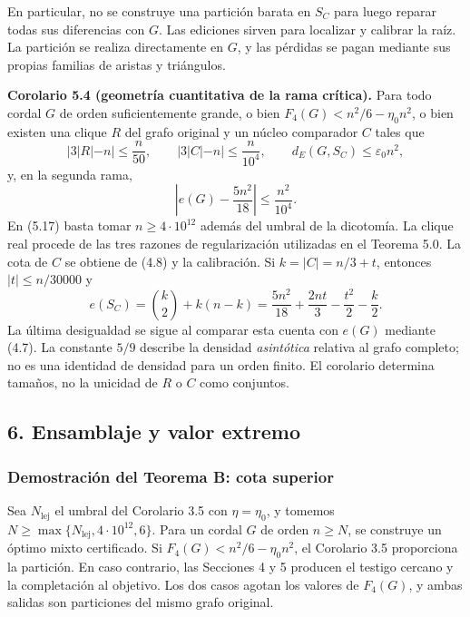 \documentclass[spanish,11pt,a4paper]{article}
\begin{document}
En particular, no se construye una partición barata en \(S_C\) para luego reparar todas sus diferencias con \(G\). Las ediciones sirven para localizar y calibrar la raíz. La partición se realiza directamente en \(G\), y las pérdidas se pagan mediante sus propias familias de aristas y triángulos.


\textbf{Corolario 5.4 (geometría cuantitativa de la rama crítica).} Para todo cordal \(G\) de orden suficientemente grande, o bien \(F_4(G)<n^2/6-\eta_0n^2\), o bien existen una clique \(R\) del grafo original y un núcleo comparador \(C\) tales que \[
|3|R|-n|\le\frac n{50},\qquad
|3|C|-n|\le\frac n{10^4},\qquad
d_E(G,S_C)\le\varepsilon_0n^2,
\tag{5.17}
\] y, en la segunda rama, \[
\left|e(G)-\frac{5n^2}{18}\right|\le\frac{n^2}{10^4}.
\tag{5.18}
\] En (5.17) basta tomar \(n\ge4\cdot10^{12}\) además del umbral de la dicotomía. La clique real procede de las tres razones de regularización utilizadas en el Teorema 5.0. La cota de \(C\) se obtiene de (4.8) y la calibración. Si \(k=|C|=n/3+t\), entonces \(|t|\le n/30000\) y \[
e(S_C)=\binom k2+k(n-k)
=\frac{5n^2}{18}+\frac{2nt}{3}-\frac{t^2}{2}-\frac{k}{2}.
\] La última desigualdad se sigue al comparar esta cuenta con \(e(G)\) mediante (4.7). La constante \(5/9\) describe la densidad \emph{asintótica} relativa al grafo completo; no es una identidad de densidad para un orden finito. El corolario determina tamaños, no la unicidad de \(R\) o \(C\) como conjuntos.

\subsection{6. Ensamblaje y valor extremo}\label{ensamblaje-y-valor-extremo}

\subsubsection{Demostración del Teorema B: cota superior}\label{demostracion-del-teorema-b-cota-superior}

Sea \(N_{\mathrm{lej}}\) el umbral del Corolario 3.5 con \(\eta=\eta_0\), y tomemos \(N\ge\max\{N_{\mathrm{lej}},4\cdot10^{12},6\}\). Para un cordal \(G\) de orden \(n\ge N\), se construye un óptimo mixto certificado. Si \(F_4(G)<n^2/6-\eta_0n^2\), el Corolario 3.5 proporciona la partición. En caso contrario, las Secciones 4 y 5 producen el testigo cercano y la completación al objetivo. Los dos casos agotan los valores de \(F_4(G)\), y ambas salidas son particiones del mismo grafo original.
\end{document}
